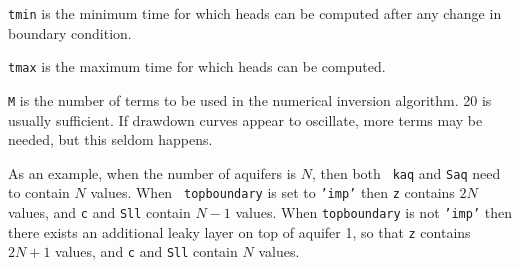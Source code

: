 \documentclass [10pt,letterpaper] {article}
\begin{document}
\begin{description}
\begin{description}
       \item{\tt tmin} is the minimum time for which heads can be computed after any change in boundary condition.
    \item {\tt tmax} is the maximum time for which heads can be computed.
    \item {\tt M} is the number of terms to be used in the numerical inversion algorithm. 20 is usually sufficient. If drawdown curves appear to oscillate, more terms may be needed, but this seldom happens. 
    \end{description}
\end{description}
As an example, when the number of aquifers is $N$, then both {\tt
kaq} and {\tt Saq} need to contain $N$ values. When {\tt
topboundary} is set to {\tt 'imp'} then {\tt z} contains $2N$
values, and {\tt c} and {\tt Sll} contain $N-1$ values.   When
{\tt topboundary} is not {\tt 'imp'} then there exists an
additional leaky layer on top of aquifer 1, so that {\tt z}
contains $2N+1$ values, and {\tt c} and {\tt Sll} contain $N$
values.
\end{document}
